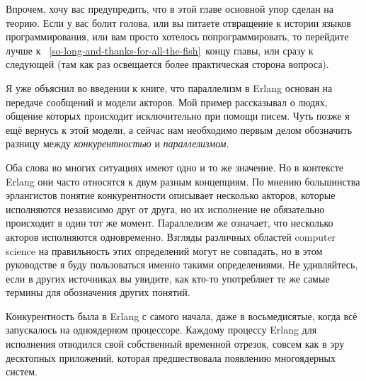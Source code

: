 Впрочем, хочу вас предупредить, что в этой главе основной упор сделан на теорию.
Если у вас болит голова, или вы питаете отвращение к истории языков программирования, или вам просто хотелось попрограммировать, то перейдите лучше к ~\ref{so-long-and-thanks-for-all-the-fish}~концу главы, или сразу к следующей (там как раз освещается более практическая сторона вопроса).

Я уже объяснил во введении к книге, что параллелизм в Erlang основан на передаче сообщений и модели акторов.
Мой пример рассказывал о людях, общение которых происходит исключительно при помощи писем.
Чуть позже я ещё вернусь к этой модели, а сейчас нам необходимо первым делом обозначить разницу между \emph{конкурентностью} и \emph{параллелизмом}.

Оба слова во многих ситуациях имеют одно и то же значение.
Но в контексте Erlang они часто относятся к двум разным концепциям.
По мнению большинства эрлангистов понятие конкурентности описывает несколько акторов, которые исполняются независимо друг от друга, но их исполнение не обязательно происходит в один тот же момент.
Параллелизм же означает, что несколько акторов исполняются одновременно.
Взгляды различных областей computer science на правильность этих определений могут не совпадать, но в этом руководстве я буду пользоваться именно такими определениями.
Не удивляйтесь, если в других источниках вы увидите, как кто\--то употребляет те же самые термины для обозначения других понятий.

Конкурентность была в Erlang с самого начала, даже в восьмедисятые, когда всё запускалось на одноядерном процессоре.
Каждому процессу Erlang для исполнения отводился свой собственный временной отрезок, совсем как в эру десктопных приложений, которая предшествовала появлению многоядерных систем.

